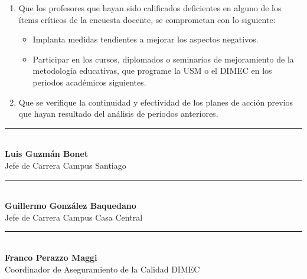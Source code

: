 \documentclass[12pt]{article}
\begin{document}
\begin{text}
\begin{enumerate}
    \item Que los profesores que hayan sido calificados deficientes en alguno de los ítems críticos de la encuesta docente, se comprometan con lo siguiente: \\
        \begin{itemize}
            \item Implanta medidas tendientes a mejorar los aspectos negativos.
            \item Participar en los cursos, diplomados o seminarios de mejoramiento de la metodología educativas, que programe la USM o el DIMEC en los periodos académicos siguientes.
        \end{itemize}
    \item Que se verifique la continuidad y efectividad de los planes de acción previos que hayan resultado del análisis de periodos anteriores.     
\end{enumerate}
\end{text}

\newpage
\vspace*{7cm}
\centering
\begin{minipage}[c]{.45\textwidth}
    \centering
    \noindent\rule{\textwidth}{0.4pt} \\
    \textbf{Luis Guzmán Bonet} \\
    Jefe de Carrera Campus Santiago
\end{minipage}\hfill
\begin{minipage}{.45\textwidth}
    \centering
    \noindent\rule{\textwidth}{0.4pt} \\
    \textbf{Guillermo González Baquedano}\\
    Jefe de Carrera Campus Casa Central
\end{minipage}

\vspace*{5cm}
\begin{minipage}{.45\textwidth}
    \centering
    \noindent\rule{\textwidth}{0.4pt} \\
    \textbf{Franco Perazzo Maggi}\\
    Coordinador de Aseguramiento de la Calidad DIMEC
\end{minipage}
\end{document}
